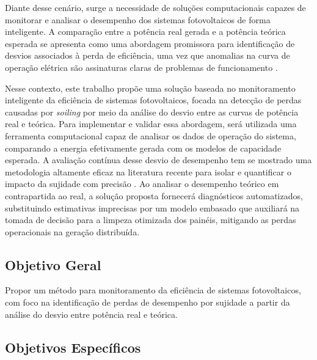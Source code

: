 \documentclass{UNESC}
\begin{document}
Diante desse cenário, surge a necessidade de soluções computacionais capazes de monitorar e analisar o desempenho dos sistemas fotovoltaicos de forma inteligente. A comparação entre a potência real gerada e a potência teórica esperada se apresenta como uma abordagem promissora para identificação de desvios associados à perda de eficiência, uma vez que anomalias na curva de operação elétrica são assinaturas claras de problemas de funcionamento \cite{Araujo_Marques}.

Nesse contexto, este trabalho propõe uma solução baseada no monitoramento inteligente da eficiência de sistemas fotovoltaicos, focada na detecção de perdas causadas por \textit{soiling} por meio da análise do desvio entre as curvas de potência real e teórica. Para implementar e validar essa abordagem, será utilizada uma ferramenta computacional capaz de analisar os dados de operação do sistema, comparando a energia efetivamente gerada com os modelos de capacidade esperada. A avaliação contínua desse desvio de desempenho tem se mostrado uma metodologia altamente eficaz na literatura recente para isolar e quantificar o impacto da sujidade com precisão \cite{Tramontin_Rampinelli_2024}. Ao analisar o desempenho teórico em contrapartida ao real, a solução proposta fornecerá diagnósticos automatizados, substituindo estimativas imprecisas por um modelo embasado que auxiliará na tomada de decisão para a limpeza otimizada dos painéis, mitigando as perdas operacionais na geração distribuída.

\subsection{Objetivo Geral}

Propor um método para monitoramento da eficiência de sistemas fotovoltaicos, com foco na identificação de perdas de desempenho por sujidade a partir da análise do desvio entre potência real e teórica.

\subsection{Objetivos Específicos}
\end{document}
